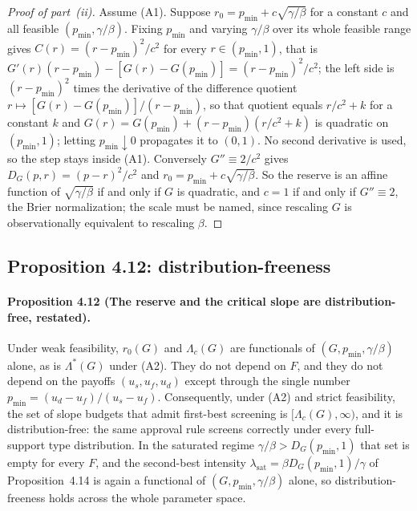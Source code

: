 \documentclass[acmsmall,nonacm,screen]{acmart}
\theoremstyle{acmplain}%
\theoremstyle{acmdefinition}%
\numberwithin{equation}{section}
\begin{document}
\begin{appendix}
\begin{proof}[Proof of part~(ii)]
Assume (A1). Suppose $r_0=p_{\min}+c\sqrt{\gamma/\beta}$ for a constant $c$ and all feasible $(p_{\min},\gamma/\beta)$. Fixing $p_{\min}$ and varying $\gamma/\beta$ over its whole feasible range gives $C(r)=(r-p_{\min})^2/c^2$ for every $r\in(p_{\min},1)$, that is $G'(r)(r-p_{\min})-[G(r)-G(p_{\min})]=(r-p_{\min})^2/c^2$; the left side is $(r-p_{\min})^2$ times the derivative of the difference quotient $r\mapsto[G(r)-G(p_{\min})]/(r-p_{\min})$, so that quotient equals $r/c^2+k$ for a constant $k$ and $G(r)=G(p_{\min})+(r-p_{\min})(r/c^2+k)$ is quadratic on $(p_{\min},1)$; letting $p_{\min}\downarrow0$ propagates it to $(0,1)$. No second derivative is used, so the step stays inside (A1). Conversely $G''\equiv2/c^2$ gives $D_G(p,r)=(p-r)^2/c^2$ and $r_0=p_{\min}+c\sqrt{\gamma/\beta}$. So the reserve is an affine function of $\sqrt{\gamma/\beta}$ if and only if $G$ is quadratic, and $c=1$ if and only if $G''\equiv2$, the Brier normalization; the scale must be named, since rescaling $G$ is observationally equivalent to rescaling $\beta$.
\end{proof}


\subsection{Proposition 4.12: distribution-freeness}

\paragraph*{Proposition 4.12 (The reserve and the critical slope are distribution-free, restated).}
Under weak feasibility, $r_0(G)$ and $\Lambda_c(G)$ are functionals of $(G,p_{\min},\gamma/\beta)$ alone, as is $\Lambda^*(G)$ under (A2). They do not depend on $F$, and they do not depend on the payoffs $(u_s,u_f,u_d)$ except through the single number $p_{\min} = (u_d-u_f)/(u_s-u_f)$. Consequently, under (A2) and strict feasibility, the set of slope budgets that admit first-best screening is $[\Lambda_c(G),\infty)$, and it is distribution-free: the same approval rule screens correctly under every full-support type distribution. In the saturated regime $\gamma/\beta > D_G(p_{\min},1)$ that set is empty for every $F$, and the second-best intensity $\lambda_{\mathrm{sat}} = \beta D_G(p_{\min},1)/\gamma$ of Proposition~4.14 is again a functional of $(G,p_{\min},\gamma/\beta)$ alone, so distribution-freeness holds across the whole parameter space.


\end{appendix}
\end{document}
